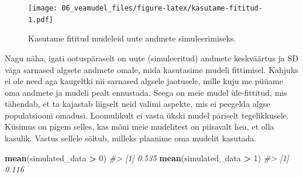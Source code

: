 \documentclass[]{book}
\newenvironment{Shaded}{\begin{snugshade}}{\end{snugshade}}
\newcommand{\KeywordTok}[1]{\textcolor[rgb]{0.13,0.29,0.53}{\textbf{#1}}}
\newcommand{\DataTypeTok}[1]{\textcolor[rgb]{0.13,0.29,0.53}{#1}}
\newcommand{\DecValTok}[1]{\textcolor[rgb]{0.00,0.00,0.81}{#1}}
\newcommand{\StringTok}[1]{\textcolor[rgb]{0.31,0.60,0.02}{#1}}
\newcommand{\CommentTok}[1]{\textcolor[rgb]{0.56,0.35,0.01}{\textit{#1}}}
\newcommand{\OperatorTok}[1]{\textcolor[rgb]{0.81,0.36,0.00}{\textbf{#1}}}
\newcommand{\NormalTok}[1]{#1}
\begin{document}
\begin{Shaded}
\end{Shaded}

\begin{figure}
\centering
\texttt{[image: 06\_veamudel\_files/figure-latex/kasutame-fititud-1.pdf]}
\caption{\label{fig:kasutame-fititud}Kasutame fititud mudeleid uute andmete
simuleerimiseks.}
\end{figure}

Nagu näha, igati ootuspäraselt on uute (simuleeritud) andmete
keskväärtus ja SD väga sarnased algsete andmete omale, mida kasutasime
mudeli fittimisel. Kahjuks ei ole need aga kaugeltki nii sarnased
algsele jaotusele, mille kuju me püüame oma andmete ja mudeli pealt
ennustada. Seega on meie mudel üle-fittitud, mis tähendab, et ta
kajastab liigselt neid valimi aspekte, mis ei peegelda algse
populatsiooni omadusi. Loomulikult ei vasta ükski mudel päriselt
tegelikkusele. Küsimus on pigem selles, kas mõni meie mudelitest on
piisavalt hea, et olla kasulik. Vastus sellele sõltub, milleks plaanime
oma mudelit kasutada.

\begin{Shaded}
\begin{Highlighting}[]
\KeywordTok{mean}\NormalTok{(simulated_data }\OperatorTok{>}\StringTok{ }\DecValTok{0}\NormalTok{) }
\CommentTok{#> [1] 0.535}
\KeywordTok{mean}\NormalTok{(simulated_data }\OperatorTok{>}\StringTok{ }\DecValTok{1}\NormalTok{)}
\CommentTok{#> [1] 0.116}
\end{Highlighting}
\end{Shaded}
\end{document}
